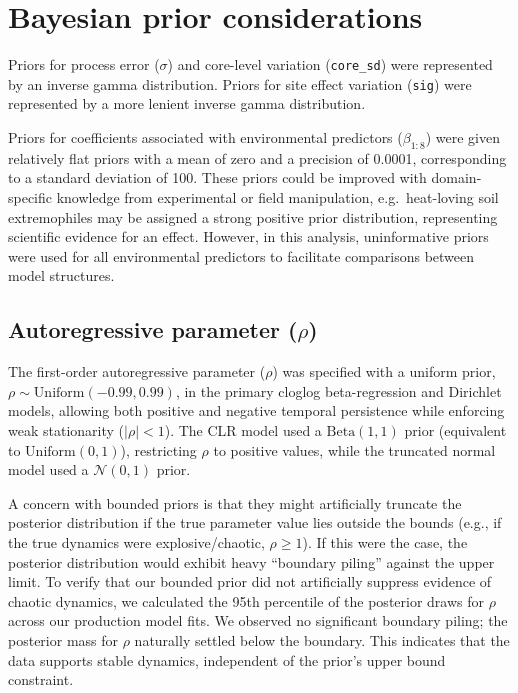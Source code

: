 \documentclass[11pt]{article}
\begin{document}
\section{Bayesian prior considerations}

Priors for process error ($\sigma$) and core-level variation (\texttt{core\_sd}) were represented by an inverse gamma distribution. Priors for site effect variation (\texttt{sig}) were represented by a more lenient inverse gamma distribution.

Priors for coefficients associated with environmental predictors ($\beta_{1:8}$) were given relatively flat priors with a mean of zero and a precision of 0.0001, corresponding to a standard deviation of 100. These priors could be improved with domain-specific knowledge from experimental or field manipulation, e.g.\ heat-loving soil extremophiles may be assigned a strong positive prior distribution, representing scientific evidence for an effect. However, in this analysis, uninformative priors were used for all environmental predictors to facilitate comparisons between model structures.

\subsection*{Autoregressive parameter ($\rho$)}

The first-order autoregressive parameter ($\rho$) was specified with a uniform prior, $\rho \sim \mathrm{Uniform}(-0.99, 0.99)$, in the primary cloglog beta-regression and Dirichlet models, allowing both positive and negative temporal persistence while enforcing weak stationarity ($|\rho| < 1$). The CLR model used a $\mathrm{Beta}(1, 1)$ prior (equivalent to $\mathrm{Uniform}(0, 1)$), restricting $\rho$ to positive values, while the truncated normal model used a $\mathcal{N}(0, 1)$ prior.

A concern with bounded priors is that they might artificially truncate the posterior distribution if the true parameter value lies outside the bounds (e.g., if the true dynamics were explosive/chaotic, $\rho \ge 1$). If this were the case, the posterior distribution would exhibit heavy ``boundary piling'' against the upper limit. To verify that our bounded prior did not artificially suppress evidence of chaotic dynamics, we calculated the 95th percentile of the posterior draws for $\rho$ across our production model fits. We observed no significant boundary piling; the posterior mass for $\rho$ naturally settled below the boundary. This indicates that the data supports stable dynamics, independent of the prior's upper bound constraint.
\end{document}

